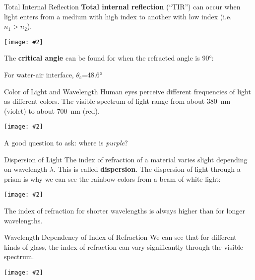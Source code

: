\documentclass[12pt,compress,aspectratio=169]{beamer}
\newcommand{\pic}[2]{\texttt{[image: \#2]}}
\newcommand{\eq}[2]{\vspace{#1}{\LARGE\begin{displaymath}#2\end{displaymath}}}
\begin{document}
\begin{frame}{Total Internal Reflection}
  \textbf{Total internal reflection} (``TIR'') can occur when light enters from
  a medium with high index to another with low index (i.e.\ $n_1>n_2$).
  \begin{center}
    \pic{.55}{graphics/660px-RefractionReflextion}
  \end{center}
  The \textbf{critical angle} can be found for when the refracted angle is
  \ang{90}:

  \eq{-.2in}{
    \boxed{\theta_c=\sin^{-1}\left(\frac{n_2}{n_1}\right)}
  }
  For water-air interface, $\theta_c$=\ang{48.6}
\end{frame}



\begin{frame}{Color of Light and Wavelength}
  Human eyes perceive different frequencies of light as different colors. The
  visible spectrum of light range from about \SI{380}{\nano\metre} (violet) to
  about \SI{700}{\nano\metre} (red).
  \begin{center}
    \pic{.6}{graphics/electromagneticspectrum-141b490bac872789434}
  \end{center}
  A good question to ask: where is \emph{purple}?
\end{frame}



\begin{frame}{Dispersion of Light}
  The index of refraction of a material varies slight depending on wavelength
  $\lambda$. This is called \textbf{dispersion}. The dispersion of light
  through a prism is why we can see the rainbow colors from a beam of white
  light:
  \begin{center}
    \pic{.3}{graphics/Prism_rainbow_schema}
  \end{center}
  The index of refraction for shorter wavelengths is always higher than for
  longer wavelengths.
\end{frame}



\begin{frame}{Wavelength Dependency of Index of Refraction}
  We can see that for different kinds of glass, the index of refraction can vary
  significantly through the visible spectrum.
  \begin{center}
    \pic{.4}{graphics/Dispersion-curve}
  \end{center}
\end{frame}
\end{document}
